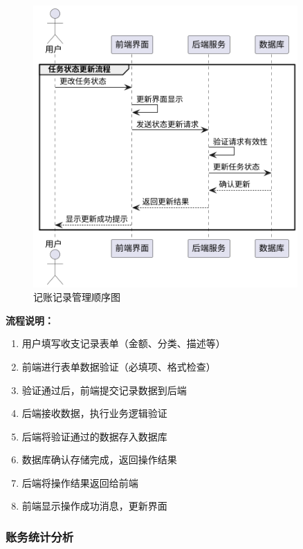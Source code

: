 \documentclass[a4paper]{article}
\begin{document}
\begin{figure}[H]
\centering
\includegraphics[width=0.9\textwidth]{img/sequence_diagram3.png}
\caption{记账记录管理顺序图}
\end{figure}

\textbf{流程说明：}

\begin{enumerate}
    \item 用户填写收支记录表单（金额、分类、描述等）
    \item 前端进行表单数据验证（必填项、格式检查）
    \item 验证通过后，前端提交记录数据到后端
    \item 后端接收数据，执行业务逻辑验证
    \item 后端将验证通过的数据存入数据库
    \item 数据库确认存储完成，返回操作结果
    \item 后端将操作结果返回给前端
    \item 前端显示操作成功消息，更新界面
\end{enumerate}

\subsubsection{账务统计分析}
\end{document}
